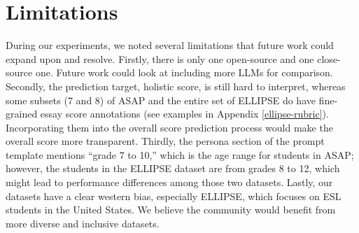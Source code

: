 \section{Limitations}
\label{limitations}

During our experiments, we noted several limitations that future work could expand upon and resolve. Firstly, there is only one open-source and one close-source one. Future work could look at including more LLMs for comparison. Secondly, the prediction target, holistic score, is still hard to interpret, whereas some subsets (7 and 8) of ASAP and the entire set of ELLIPSE do have fine-grained essay score annotations (see examples in Appendix \ref{ellipse-rubric}). Incorporating them into the overall score prediction process would make the overall score more transparent. Thirdly, the persona section of the prompt template mentions ``grade 7 to 10,'' which is the age range for students in ASAP; however, the students in the ELLIPSE dataset are from grades 8 to 12, which might lead to performance differences among those two datasets. Lastly, our datasets have a clear western bias, especially ELLIPSE, which focuses on ESL students in the United States. We believe the community would benefit from more diverse and inclusive datasets.
